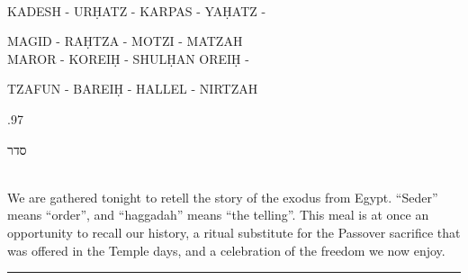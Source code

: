 \documentclass[letter,11pt,openany]{memoir}
\newcommand{\hchapter}[1]{ 
\begin{hebrew}
	\begin{Spacing}
		{.97} 
		\newpage \strut
		
		\vspace{.15em}
		\begin{flushleft}
			\noindent\Huge #1 
		\end{flushleft}
		
		\vspace{1em} 
	\end{Spacing}
\end{hebrew}

}
\newcommand{\HgFill}{
\vfill \hrule 
\vfill}
\newenvironment{HgEnglish}{\strut\\
\noindent}{\vspace{1em}}
\newenvironment{HgTranslit}{\strut\\
\noindent
\begin{itshape}
	}{
\end{itshape}
\vspace{1em}}
\begin{document}
\begin{HgTranslit}
	\begin{center}
		{\footnotesize KADESH - UR\d{H}ATZ - KARPAS - YA\d{H}ATZ - 
		
		MAGID - RA\d{H}TZA - MOTZI - MATZAH \\
		MAROR - KOREI\d{H} - SHUL\d{H}AN OREI\d{H} - 
		
		TZAFUN - BAREI\d{H} - HALLEL - NIRTZAH} 
	\end{center}
\end{HgTranslit}

\vfill

\hchapter{סדר}

\vfill
\begin{HgEnglish}
	We are gathered tonight to retell the story of the exodus from Egypt. ``Seder'' means ``order'', and ``haggadah'' means ``the telling''. This meal is at once an opportunity to recall our history, a ritual substitute for the Passover sacrifice that was offered in the Temple days, and a celebration of the freedom we now enjoy. 
\end{HgEnglish}

\HgFill
\end{document}
